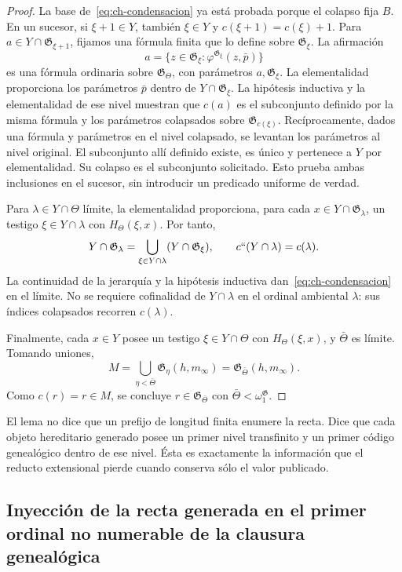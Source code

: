 \begin{proof}
La base de~\eqref{eq:ch-condensacion} ya está probada porque el colapso fija \(B\). En un
sucesor, si \(\xi+1\in Y\), también \(\xi\in Y\) y
\(c(\xi+1)=c(\xi)+1\). Para
\(a\in Y\cap\mathfrak G_{\xi+1}\), fijamos una fórmula finita que lo
define sobre \(\mathfrak G_\xi\). La afirmación
\[
 a=\{z\in\mathfrak G_\xi:
                  \varphi^{\mathfrak G_\xi}(z,\bar p)\}
\]
es una fórmula ordinaria sobre \(\mathfrak G_\Theta\), con parámetros
\(a,\mathfrak G_\xi\). La elementalidad proporciona los parámetros
\(\bar p\) dentro de \(Y\cap\mathfrak G_\xi\). La hipótesis inductiva
y la elementalidad de ese nivel muestran que \(c(a)\) es el subconjunto
definido por la misma fórmula y los parámetros colapsados sobre
\(\mathfrak G_{c(\xi)}\). Recíprocamente, dados una fórmula y parámetros
en el nivel colapsado, se levantan los parámetros al nivel original.
El subconjunto allí definido existe, es único y pertenece a \(Y\) por
elementalidad. Su colapso es el subconjunto solicitado. Esto prueba ambas
inclusiones en el sucesor, sin introducir un predicado uniforme de verdad.

Para \(\lambda\in Y\cap\Theta\) límite, la elementalidad proporciona,
para cada \(x\in Y\cap\mathfrak G_\lambda\), un testigo
\(\xi\in Y\cap\lambda\) con \(H_\Theta(\xi,x)\). Por tanto,
\[
 Y\cap\mathfrak G_\lambda
 =\bigcup_{\xi\in Y\cap\lambda}(Y\cap\mathfrak G_\xi),
 \qquad c``(Y\cap\lambda)=c(\lambda).
\]
La continuidad de la jerarquía y la hipótesis inductiva dan~\eqref{eq:ch-condensacion} en el
límite. No se requiere cofinalidad de \(Y\cap\lambda\) en el ordinal
ambiental \(\lambda\): sus índices colapsados recorren \(c(\lambda)\).

Finalmente, cada \(x\in Y\) posee un testigo \(\xi\in Y\cap\Theta\)
con \(H_\Theta(\xi,x)\), y \(\bar\Theta\) es límite. Tomando uniones,
\[
 M=\bigcup_{\eta<\bar\Theta}\mathfrak G_\eta(h,m_\infty)
  =\mathfrak G_{\bar\Theta}(h,m_\infty).
\]
Como \(c(r)=r\in M\), se concluye
\(r\in\mathfrak G_{\bar\Theta}\) con
\(\bar\Theta<\omega_1^{\mathfrak G}\).
\end{proof}

El lema no dice que un prefijo de longitud finita enumere la recta. Dice que
cada objeto hereditario generado posee un primer nivel transfinito y un primer
código genealógico dentro de ese nivel. Ésta es exactamente la información que
el reducto extensional pierde cuando conserva sólo el valor publicado.

\subsection{Inyección de la recta generada en el primer ordinal no numerable de la clausura genealógica}

